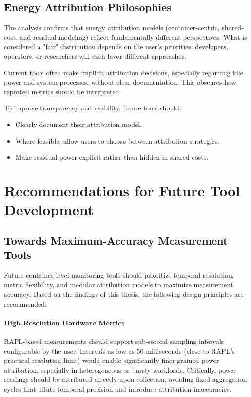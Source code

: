 \subsection{Energy Attribution Philosophies}

The analysis confirms that energy attribution models (container-centric, shared-cost, and residual modeling) reflect fundamentally different perspectives. What is considered a "fair" distribution depends on the user’s priorities: developers, operators, or researchers will each favor different approaches.

Current tools often make implicit attribution decisions, especially regarding idle power and system processes, without clear documentation. This obscures how reported metrics should be interpreted.

To improve transparency and usability, future tools should:
\begin{itemize}
    \item Clearly document their attribution model.
    \item Where feasible, allow users to choose between attribution strategies.
    \item Make residual power explicit rather than hidden in shared costs.
\end{itemize}

\section{Recommendations for Future Tool Development}
\label{sec:future-tools}

\subsection{Towards Maximum-Accuracy Measurement Tools}
\label{sec:future-maximum-accuracy}

Future container-level monitoring tools should prioritize temporal resolution, metric flexibility, and modular attribution models to maximize measurement accuracy. Based on the findings of this thesis, the following design principles are recommended:

\paragraph{High-Resolution Hardware Metrics}
RAPL-based measurements should support sub-second sampling intervals configurable by the user. Intervals as low as 50 milliseconds (close to RAPL's practical resolution limit) would enable significantly finer-grained power attribution, especially in heterogeneous or bursty workloads. Critically, power readings should be attributed directly upon collection, avoiding fixed aggregation cycles that dilute temporal precision and introduce attribution inaccuracies.

